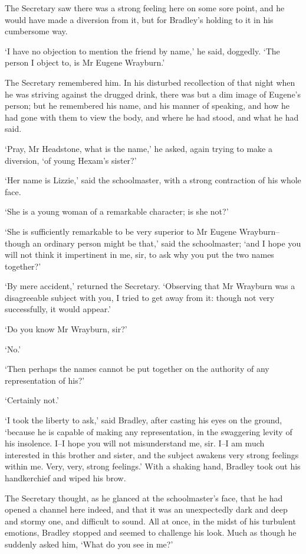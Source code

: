 The Secretary saw there was a strong feeling here on some sore point,
and he would have made a diversion from it, but for Bradley’s holding to
it in his cumbersome way.

‘I have no objection to mention the friend by name,’ he said, doggedly.
‘The person I object to, is Mr Eugene Wrayburn.’

The Secretary remembered him. In his disturbed recollection of that
night when he was striving against the drugged drink, there was but a
dim image of Eugene’s person; but he remembered his name, and his manner
of speaking, and how he had gone with them to view the body, and where
he had stood, and what he had said.

‘Pray, Mr Headstone, what is the name,’ he asked, again trying to make a
diversion, ‘of young Hexam’s sister?’

‘Her name is Lizzie,’ said the schoolmaster, with a strong contraction
of his whole face.

‘She is a young woman of a remarkable character; is she not?’

‘She is sufficiently remarkable to be very superior to Mr Eugene
Wrayburn--though an ordinary person might be that,’ said the
schoolmaster; ‘and I hope you will not think it impertinent in me, sir,
to ask why you put the two names together?’

‘By mere accident,’ returned the Secretary. ‘Observing that Mr Wrayburn
was a disagreeable subject with you, I tried to get away from it: though
not very successfully, it would appear.’

‘Do you know Mr Wrayburn, sir?’

‘No.’

‘Then perhaps the names cannot be put together on the authority of any
representation of his?’

‘Certainly not.’

‘I took the liberty to ask,’ said Bradley, after casting his eyes on
the ground, ‘because he is capable of making any representation, in the
swaggering levity of his insolence. I--I hope you will not misunderstand
me, sir. I--I am much interested in this brother and sister, and the
subject awakens very strong feelings within me. Very, very, strong
feelings.’ With a shaking hand, Bradley took out his handkerchief and
wiped his brow.

The Secretary thought, as he glanced at the schoolmaster’s face, that he
had opened a channel here indeed, and that it was an unexpectedly dark
and deep and stormy one, and difficult to sound. All at once, in the
midst of his turbulent emotions, Bradley stopped and seemed to challenge
his look. Much as though he suddenly asked him, ‘What do you see in me?’

